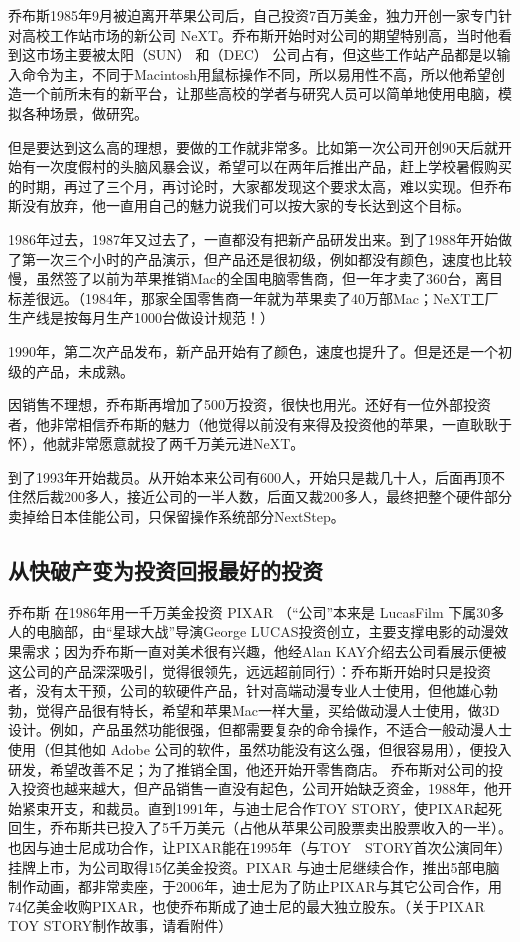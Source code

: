 乔布斯1985年9月被迫离开苹果公司后，自己投资7百万美金，独力开创一家专门针对高校工作站市场的新公司
NeXT。乔布斯开始时对公司的期望特别高，当时他看到这市场主要被太阳（SUN）
和（DEC）
公司占有，但这些工作站产品都是以输入命令为主，不同于Macintosh用鼠标操作不同，所以易用性不高，所以他希望创造一个前所未有的新平台，让那些高校的学者与研究人员可以简单地使用电脑，模拟各种场景，做研究。

但是要达到这么高的理想，要做的工作就非常多。比如第一次公司开创90天后就开始有一次度假村的头脑风暴会议，希望可以在两年后推出产品，赶上学校暑假购买的时期，再过了三个月，再讨论时，大家都发现这个要求太高，难以实现。但乔布斯没有放弃，他一直用自己的魅力说我们可以按大家的专长达到这个目标。

1986年过去，1987年又过去了，一直都没有把新产品研发出来。到了1988年开始做了第一次三个小时的产品演示，但产品还是很初级，例如都没有颜色，速度也比较慢，虽然签了以前为苹果推销Mac的全国电脑零售商，但一年才卖了360台，离目标差很远。（1984年，那家全国零售商一年就为苹果卖了40万部Mac；NeXT工厂生产线是按每月生产1000台做设计规范！）

1990年，第二次产品发布，新产品开始有了颜色，速度也提升了。但是还是一个初级的产品，未成熟。

因销售不理想，乔布斯再增加了500万投资，很快也用光。还好有一位外部投资者，他非常相信乔布斯的魅力（他觉得以前没有来得及投资他的苹果，一直耿耿于怀），他就非常愿意就投了两千万美元进NeXT。

到了1993年开始裁员。从开始本来公司有600人，开始只是裁几十人，后面再顶不住然后裁200多人，接近公司的一半人数，后面又裁200多人，最终把整个硬件部分卖掉给日本佳能公司，只保留操作系统部分NextStep。

\hypertarget{ux4eceux5febux7834ux4ea7ux53d8ux4e3aux6295ux8d44ux56deux62a5ux6700ux597dux7684ux6295ux8d44}{%
\subsection{从快破产变为投资回报最好的投资}\label{ux4eceux5febux7834ux4ea7ux53d8ux4e3aux6295ux8d44ux56deux62a5ux6700ux597dux7684ux6295ux8d44}}

乔布斯 在1986年用一千万美金投资 PIXAR （``公司''本来是 LucasFilm
下属30多人的电脑部，由``星球大战''导演George
LUCAS投资创立，主要支撑电影的动漫效果需求；因为乔布斯一直对美术很有兴趣，他经Alan
KAY介绍去公司看展示便被这公司的产品深深吸引，觉得很领先，远远超前同行）：乔布斯开始时只是投资者，没有太干预，公司的软硬件产品，针对高端动漫专业人士使用，但他雄心勃勃，觉得产品很有特长，希望和苹果Mac一样大量，买给做动漫人士使用，做3D设计。例如，产品虽然功能很强，但都需要复杂的命令操作，不适合一般动漫人士使用（但其他如
Adobe
公司的软件，虽然功能没有这么强，但很容易用），便投入研发，希望改善不足；为了推销全国，他还开始开零售商店。
乔布斯对公司的投入投资也越来越大，但产品销售一直没有起色，公司开始缺乏资金，1988年，他开始紧束开支，和裁员。直到1991年，与迪士尼合作TOY
STORY，使PIXAR起死回生，乔布斯共已投入了5千万美元（占他从苹果公司股票卖出股票收入的一半）。也因与迪士尼成功合作，让PIXAR能在1995年（与TOY　STORY首次公演同年）挂牌上市，为公司取得15亿美金投资。PIXAR
与迪士尼继续合作，推出5部电脑制作动画，都非常卖座，于2006年，迪士尼为了防止PIXAR与其它公司合作，用74亿美金收购PIXAR，也使乔布斯成了迪士尼的最大独立股东。（关于PIXAR
TOY STORY制作故事，请看附件）

